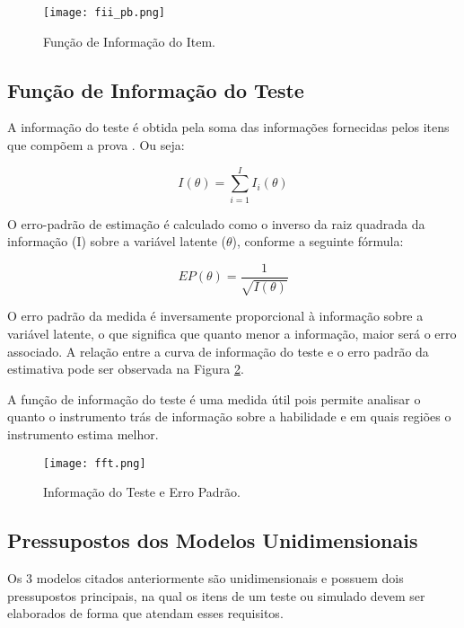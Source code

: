 \begin{figure}[H]
	\centering
	\texttt{[image: fii\_pb.png]}
	\caption{Função de Informação do Item.}
	\label{fig:fii}
\end{figure}

\subsection{Função de Informação do Teste}

A informação do teste é obtida pela soma das informações fornecidas pelos itens que compõem a prova \cite{de2000teoria}. Ou seja:

\begin{equation}\label{eq:info_teste}
I(\theta) = \sum_{i=1}^{I}I_i(\theta)
\end{equation}

 O erro-padrão de estimação é calculado como o inverso da raiz quadrada da informação (I) sobre a variável latente ($\theta$), conforme a seguinte fórmula:

\[
EP(\theta) = \dfrac{1}{\sqrt{I(\theta)}}
\]


O erro padrão da medida é inversamente proporcional à informação sobre a variável latente, o que significa que quanto menor a informação, maior será o erro associado. A relação entre a curva de informação do teste e o erro padrão da estimativa pode ser observada na Figura \ref{fig:fft}.

A função de informação do teste é uma medida útil pois permite analisar o quanto o instrumento trás de informação sobre a habilidade e em quais regiões o instrumento estima melhor.

\begin{figure}[H]
	\centering
	\texttt{[image: fft.png]}
	\caption{Informação do Teste e Erro Padrão.}
	\label{fig:fft}
\end{figure}



\subsection{Pressupostos dos Modelos Unidimensionais}

Os 3 modelos citados anteriormente são unidimensionais e possuem dois pressupostos principais, na qual os itens de um teste ou simulado devem ser elaborados de forma que atendam esses requisitos. 

